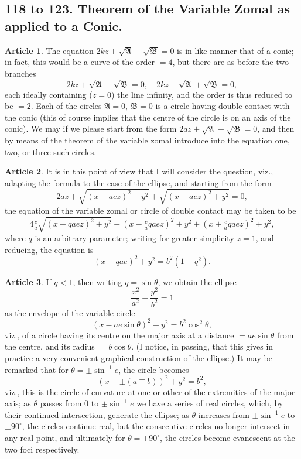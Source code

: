 \documentclass[11pt,a4paper]{article}
\theoremstyle{definition}
\newtheorem{art}{Article}
\begin{document}
\subsection*{118 to 123. Theorem of the Variable Zomal as applied to a Conic.}

\begin{art}
The equation $2kz + \sqrt{\mathfrak{A}} + \sqrt{\mathfrak{B}} = 0$ is in like manner that of a conic; in fact, this would be a curve of the order $= 4$, but there are as before the two branches
\[
2kz + \sqrt{\mathfrak{A}} - \sqrt{\mathfrak{B}} = 0, \quad 2kz - \sqrt{\mathfrak{A}} + \sqrt{\mathfrak{B}} = 0,
\]
each ideally containing ($z = 0$) the line infinity, and the order is thus reduced to be $= 2$. Each of the circles $\mathfrak{A} = 0$, $\mathfrak{B} = 0$ is a circle having double contact with the conic (this of course implies that the centre of the circle is on an axis of the conic). We may if we please start from the form $2az + \sqrt{\mathfrak{A}} + \sqrt{\mathfrak{B}} = 0$, and then by means of the theorem of the variable zomal introduce into the equation one, two, or three such circles.
\end{art}

\begin{art}
It is in this point of view that I will consider the question, viz., adapting the formula to the case of the ellipse, and starting from the form
\[
2az + \sqrt{(x - aez)^{2} + y^{2}} + \sqrt{(x + aez)^{2} + y^{2}} = 0,
\]
the equation of the variable zomal or circle of double contact may be taken to be
\[
4\tfrac{c}{a}\sqrt{(x - qaez)^{2} + y^{2}} + (x - \tfrac{c}{a}qaez)^{2} + y^{2} + (x + \tfrac{c}{a}qaez)^{2} + y^{2},
\]
where $q$ is an arbitrary parameter; writing for greater simplicity $z = 1$, and reducing, the equation is
\[
(x - qae)^{2} + y^{2} = b^{2}(1 - q^{2}).
\]
\end{art}

\begin{art}
If $q < 1$, then writing $q = \sin\theta$, we obtain the ellipse
\[
\frac{x^{2}}{a^{2}} + \frac{y^{2}}{b^{2}} = 1
\]
as the envelope of the variable circle
\[
(x - ae\sin\theta)^{2} + y^{2} = b^{2}\cos^{2}\theta,
\]
viz., of a circle having its centre on the major axis at a distance $= ae\sin\theta$ from the centre, and its radius $= b\cos\theta$. (I notice, in passing, that this gives in practice a very convenient graphical construction of the ellipse.) It may be remarked that for $\theta = \pm\sin^{-1}e$, the circle becomes
\[
(x - \pm(a \mp b))^{2} + y^{2} = b^{2},
\]
viz., this is the circle of curvature at one or other of the extremities of the major axis; as $\theta$ passes from $0$ to $\pm\sin^{-1}e$ we have a series of real circles, which, by their continued intersection, generate the ellipse; as $\theta$ increases from $\pm\sin^{-1}e$ to $\pm 90^{\circ}$, the circles continue real, but the consecutive circles no longer intersect in any real point, and ultimately for $\theta = \pm 90^{\circ}$, the circles become evanescent at the two foci respectively.
\end{art}
\end{document}
